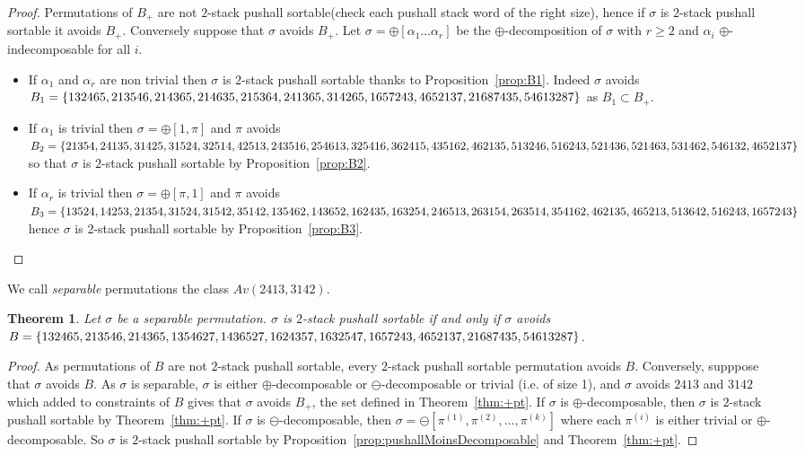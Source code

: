 \documentclass[11pt]{article}
\newtheorem{thm}{Theorem}[section]
\newcommand{\pushall}{$2$-stack pushall sortable\xspace}
\begin{document}
\begin{proof}
Permutations of $B_+$ are not \pushall (check each pushall stack word of the right size), hence if $\sigma$ is \pushall it avoids $B_+$. 
Conversely suppose that $\sigma$ avoids $B_+$. 
Let $\sigma = \oplus[\alpha_1 \dots \alpha_r]$ be the $\oplus$-decomposition of $\sigma$ with $r \geq 2$ and $\alpha_i$ $\oplus$-indecomposable for all $i$.
\begin{itemize}
\item If $\alpha_1$ and $\alpha_r$ are non trivial then $\sigma$ is \pushall thanks to Proposition~\ref{prop:B1}. 
Indeed $\sigma$ avoids $B_1 = \{ 132465, 213546, 214365, 214635, 215364, 241365, 314265, 1657243, \linebreak 4652137, 21687435, 54613287 \}$ as $B_1 \subset B_+$.
\item If $\alpha_1$ is trivial then $\sigma = \oplus[1,\pi]$ and $\pi$ avoids $B_2 = \{ 21354, 24135, 31425, 31524, 32514, \\ 42513, 243516, 254613, 325416, 362415, 435162, 462135, 513246, 516243, 521436, 521463,\linebreak 531462, 546132, 4652137 \}$ so that $\sigma$ is \pushall by Proposition~\ref{prop:B2}.
\item If $\alpha_r$ is trivial then $\sigma = \oplus[\pi, 1]$ and $\pi$ avoids $B_3 = \{13524, 14253, 21354, 31524, 31542, \\ 35142, 135462, 143652, 162435, 163254, 246513, 263154, 263514, 354162, 462135, 465213,\linebreak 513642, 516243, 1657243 \}$ hence $\sigma$ is \pushall by Proposition~\ref{prop:B3}.
\end{itemize}
\end{proof}



We call {\em separable} permutations the class $Av(2413,3142)$.

\begin{thm}
Let $\sigma$ be a separable permutation. 
$\sigma$ is \pushall if and only if $\sigma$ avoids $B = \{ 132465, 213546, 214365, 1354627, 1436527, 1624357, 1632547, 1657243, 4652137,\\ 21687435, 54613287 \}$.
\end{thm}
\begin{proof}
As permutations of $B$ are not \pushall, every \pushall permutation avoids $B$. 
Conversely, supppose that $\sigma$ avoids $B$. 
As $\sigma$ is separable, $\sigma$ is either $\oplus$-decomposable or $\ominus$-decomposable or trivial (i.e. of size 1), and $\sigma$ avoids $2413$ and $3142$ which added to constraints of $B$ gives that $\sigma$ avoids $B_+$, the set defined in Theorem~\ref{thm:+pt}.
If $\sigma$ is $\oplus$-decomposable, then $\sigma$ is \pushall by Theorem~\ref{thm:+pt}.
If $\sigma$ is $\ominus$-decomposable, then $\sigma = \ominus[\pi^{(1)},\pi^{(2)},\ldots, \pi^{(k)}]$ where each $\pi^{(i)}$ is either trivial or $\oplus$-decomposable. 
So $\sigma$ is \pushall by Proposition~\ref{prop:pushallMoinsDecomposable} and Theorem~\ref{thm:+pt}.
\end{proof}
\end{document}
